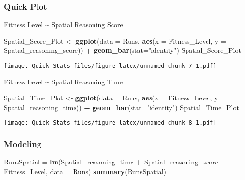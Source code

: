 \documentclass[]{article}
\newenvironment{Shaded}{\begin{snugshade}}{\end{snugshade}}
\newcommand{\KeywordTok}[1]{\textcolor[rgb]{0.13,0.29,0.53}{\textbf{#1}}}
\newcommand{\DataTypeTok}[1]{\textcolor[rgb]{0.13,0.29,0.53}{#1}}
\newcommand{\StringTok}[1]{\textcolor[rgb]{0.31,0.60,0.02}{#1}}
\newcommand{\OperatorTok}[1]{\textcolor[rgb]{0.81,0.36,0.00}{\textbf{#1}}}
\newcommand{\NormalTok}[1]{#1}
\begin{document}
\subsubsection{Quick Plot}\label{quick-plot-1}

Fitness Level \textasciitilde{} Spatial Reasoning Score

\begin{Shaded}
\begin{Highlighting}[]
\NormalTok{Spatial_Score_Plot <-}\StringTok{ }\KeywordTok{ggplot}\NormalTok{(}\DataTypeTok{data =}\NormalTok{ Runs, }\KeywordTok{aes}\NormalTok{(}\DataTypeTok{x =}\NormalTok{ Fitness_Level, }\DataTypeTok{y =}\NormalTok{ Spatial_reasoning_score)) }\OperatorTok{+}
\StringTok{  }\KeywordTok{geom_bar}\NormalTok{(}\DataTypeTok{stat=}\StringTok{"identity"}\NormalTok{)}
\NormalTok{Spatial_Score_Plot}
\end{Highlighting}
\end{Shaded}

\texttt{[image: Quick\_Stats\_files/figure-latex/unnamed-chunk-7-1.pdf]}

Fitness Level \textasciitilde{} Spatial Reasoning Time

\begin{Shaded}
\begin{Highlighting}[]
\NormalTok{Spatial_Time_Plot <-}\StringTok{ }\KeywordTok{ggplot}\NormalTok{(}\DataTypeTok{data =}\NormalTok{ Runs, }\KeywordTok{aes}\NormalTok{(}\DataTypeTok{x =}\NormalTok{ Fitness_Level, }\DataTypeTok{y =}\NormalTok{ Spatial_reasoning_time)) }\OperatorTok{+}
\StringTok{  }\KeywordTok{geom_bar}\NormalTok{(}\DataTypeTok{stat=}\StringTok{"identity"}\NormalTok{)}
\NormalTok{Spatial_Time_Plot}
\end{Highlighting}
\end{Shaded}

\texttt{[image: Quick\_Stats\_files/figure-latex/unnamed-chunk-8-1.pdf]}

\subsubsection{Modeling}\label{modeling-1}

\begin{Shaded}
\begin{Highlighting}[]
\NormalTok{RunsSpatial =}\StringTok{ }\KeywordTok{lm}\NormalTok{(Spatial_reasoning_time }\OperatorTok{+}\StringTok{ }\NormalTok{Spatial_reasoning_score }\OperatorTok{~}\StringTok{ }\NormalTok{Fitness_Level, }\DataTypeTok{data =}\NormalTok{ Runs)}
\KeywordTok{summary}\NormalTok{(RunsSpatial)}
\end{Highlighting}
\end{Shaded}
\end{document}
